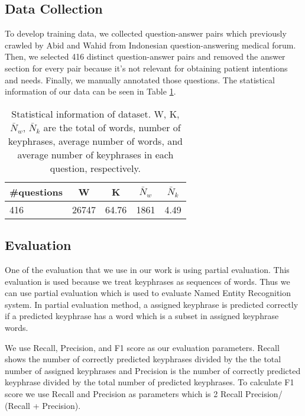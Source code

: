 \subsection{Data Collection}
To develop training data, we collected question-answer pairs which previously crawled by Abid \cite{skripsiKakAbid} and Wahid \cite{skripsiWahid} from Indonesian question-answering medical forum. Then, we selected 416 distinct question-answer pairs and removed the answer section for every pair because it's not relevant for obtaining patient intentions and needs. Finally, we manually annotated those questions. The statistical information of our data can be seen in Table \ref{tab:descriptive_stats}.

\begin{table}
	\caption{Statistical information of dataset. W, K, $\bar{N}_{w}$, $\bar{N}_{k}$ are the total of words, number of keyphrases, average number of words, and average number of keyphrases in each question, respectively.}
	\label{tab:descriptive_stats}
	\begin{tabular}{lcccc}
		\toprule
		\#questions&W&K&$\bar{N}_{w}$&$\bar{N}_{k}$\\
		\midrule
		416 & 26747  & 64.76 & 1861 & 4.49 \\
		
		\bottomrule
	\end{tabular}
\end{table}
\subsection{Evaluation}
One of the evaluation that we use in our work is using partial evaluation. This evaluation is used because we treat keyphrases as sequences of words. Thus we can use partial evaluation which is used to evaluate Named Entity Recognition system. In partial evaluation method, a assigned keyphrase is predicted correctly if a predicted keyphrase has a word which is a subset in assigned keyphrase words. 

We use Recall, Precision, and F1 score as our evaluation parameters. Recall shows the number of correctly predicted keyphrases divided by the the total number of assigned keyphrases and Precision is the number of correctly predicted keyphrase divided by the total number of predicted keyphrases. To calculate F1 score we use Recall and Precision as parameters which is 2  Recall  Precision/ (Recall + Precision).
\iffalse

